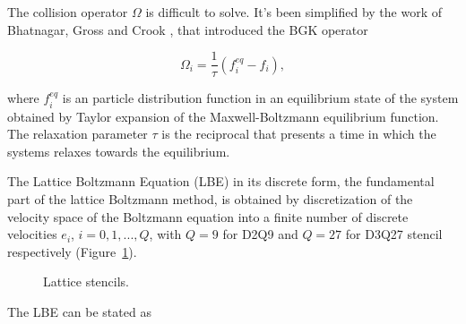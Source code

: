 The collision operator $\Omega$ is difficult to solve. It's been simplified by the work of Bhatnagar, Gross and Crook \citep{bhatnagarModelCollisionProcesses1954}, that introduced the BGK operator

\begin{equation}
	\label{eq:bgk-operator}
	\Omega_i = \frac{1}{\tau}(f^{eq}_i - f_i),
\end{equation}

where $f^{eq}_i $ is an particle distribution function in an equilibrium state of the system obtained by Taylor expansion of the Maxwell-Boltzmann equilibrium function. The relaxation parameter $\tau$ is the reciprocal that presents a time in which the systems relaxes towards the equilibrium.

The Lattice Boltzmann Equation (LBE) in its discrete form, the fundamental part of the lattice Boltzmann method, is obtained by discretization of the velocity space of the Boltzmann equation into a finite number of discrete velocities $e_i$, $i = 0,1,...,Q$, with $Q = 9$ for D2Q9 and $Q = 27$ for D3Q27 stencil respectively (Figure~\ref{fig:stencils}). 

\begin{figure}[!ht]
	\centering
	\captionsetup{justification=centering}
	 \qquad
	\caption{Lattice stencils.}
	\label{fig:stencils}
\end{figure}

The LBE can be stated as

